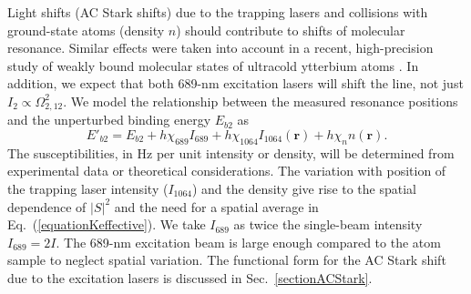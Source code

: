 
Light shifts (AC Stark shifts) due to the trapping lasers and collisions with ground-state atoms (density $n$) should contribute to shifts of molecular resonance. Similar effects were taken into account in a recent, high-precision study of weakly bound molecular states of ultracold ytterbium atoms \cite{bbc17}. In addition, we expect that both 689-nm excitation lasers will shift the line, not just $I_2\propto \Omega_{2,12}^{2}$. We model the relationship between the measured resonance positions and the unperturbed binding energy $E_{b2}$ as
\begin{equation}\label{Eq:GlobalFit}
	E'_{b2}=E_{b2}+h\chi_{689}I_{689}+h\chi_{1064}I_{1064}(\mathbf{r})+h\chi_{n}n(\mathbf{r}).
\end{equation}
The susceptibilities, in Hz per unit intensity or density, will be determined from experimental data or theoretical considerations. The variation with position of the trapping laser intensity ($I_{1064}$) and the density give rise to the spatial dependence of $|S|^2$ and the need for a spatial average in Eq.\ (\ref{equationKeffective}). We take $I_{689}$ as twice the single-beam intensity $I_{689}=2I$. The 689-nm excitation beam is large enough compared to the atom sample to neglect spatial variation. The functional form for the AC Stark shift due to the excitation lasers is discussed in Sec.\ \ref{sectionACStark}.




